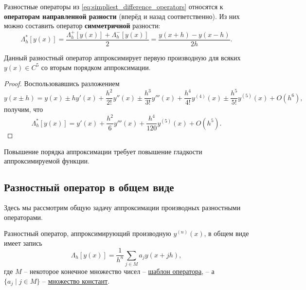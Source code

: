 \documentclass[../main.tex]{subfile}
\begin{document}
\begin{define}
	Разностные операторы из \eqref{eq:simpliest_difference_operators}
	относятся к \textbf{операторам направленной разности} (вперёд и назад
	соответственно). Из них можно составить оператор \textbf{симметричной}
	разности:
	\[\Lambda_h^*[y(x)]=\frac{\Lambda_h^+[y(x)]+\Lambda_h^-[y(x)]}{2}=
	\frac{y(x+h)-y(x-h)}{2h}.\]
\end{define}

\begin{lemma}
	Данный разностный оператор аппроксимирует первую производную для всяких
	$y(x)\in C^5$ со вторым порядком аппроксимации.
\end{lemma}

\begin{proof}
	Воспользовавшись разложением
	\[y(x\pm h)=y(x)\pm hy'(x)+\frac{h^2}{2!}y''(x)\pm\frac{h^3}{3!}y'''(x)+
	\frac{h^4}{4!}y^{(4)}(x)\pm\frac{h^5}{5!}y^{(5)}(x)+O(h^6),\]
	получим, что
	\[\Lambda_h^*[y(x)]=y'(x)+\frac{h^2}{6}y'''(x)+\frac{h^4}{120}y^{(5)}(x)
	+O(h^5).\]
\end{proof}

\begin{remark}
	Повышение порядка аппроксимации требует повышение гладкости
	аппроксимируемой функции.
\end{remark}

\subsection{Разностный оператор в общем виде}
Здесь мы рассмотрим общую задачу аппроксимации производных разностными
операторами.

\begin{define}\label{eq:general_difference_operator}
	Разностный оператор, аппроксимирующий производную $y^{(n)}(x)$, в общем
	виде имеет запись
	\[\boxed{\Lambda_h[y(x)]=\frac{1}{h^n}\sum_{j\in M}a_jy(x+jh)},\]
	где $M$ -- некоторое конечное множество чисел -- \underline{шаблон
	оператора}, -- а \\ $\{a_j\mid j\in M\}$ -- \underline{множество констант}.
\end{define}
\end{document}
